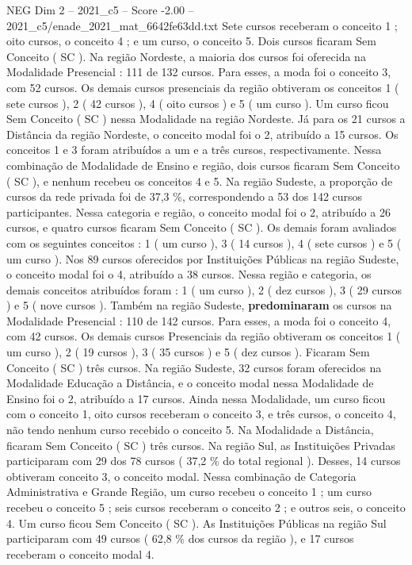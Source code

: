 \begin{textsample}{NEG Dim 2 – 2021\_c5 – Score -2.00 – 2021\_c5/enade\_2021\_mat\_6642fe63dd.txt}
Sete cursos receberam o conceito 1 ; oito cursos, o conceito 4 ; e um curso, o conceito 5.
Dois cursos ficaram Sem Conceito ( SC ).
Na região Nordeste, a maioria dos cursos foi oferecida na Modalidade Presencial : 111 de 132 cursos.
Para esses, a moda foi o conceito 3, com 52 cursos.
Os demais cursos presenciais da região obtiveram os conceitos 1 ( sete cursos ), 2 ( 42 cursos ), 4 ( oito cursos ) e 5 ( um curso ).
Um curso ficou Sem Conceito ( SC ) nessa Modalidade na região Nordeste.
Já para os 21 cursos a Distância da região Nordeste, o conceito modal foi o 2, atribuído a 15 cursos.
Os conceitos 1 e 3 foram atribuídos a um e a três cursos, respectivamente.
Nessa combinação de Modalidade de Ensino e região, dois cursos ficaram Sem Conceito ( SC ), e nenhum recebeu os conceitos 4 e 5.
Na região Sudeste, a proporção de cursos da rede privada foi de 37,3 \%, correspondendo a 53 dos 142 cursos participantes.
Nessa categoria e região, o conceito modal foi o 2, atribuído a 26 cursos, e quatro cursos ficaram Sem Conceito ( SC ).
Os demais foram avaliados com os seguintes conceitos : 1 ( um curso ), 3 ( 14 cursos ), 4 ( sete cursos ) e 5 ( um curso ).
Nos 89 cursos oferecidos por Instituições Públicas na região Sudeste, o conceito modal foi o 4, atribuído a 38 cursos.
Nessa região e categoria, os demais conceitos atribuídos foram : 1 ( um curso ), 2 ( dez cursos ), 3 ( 29 cursos ) e 5 ( nove cursos ).
Também na região Sudeste, \textbf{predominaram} os cursos na Modalidade Presencial : 110 de 142 cursos.
Para esses, a moda foi o conceito 4, com 42 cursos.
Os demais cursos Presenciais da região obtiveram os conceitos 1 ( um curso ), 2 ( 19 cursos ), 3 ( 35 cursos ) e 5 ( dez cursos ).
Ficaram Sem Conceito ( SC ) três cursos.
Na região Sudeste, 32 cursos foram oferecidos na Modalidade Educação a Distância, e o conceito modal nessa Modalidade de Ensino foi o 2, atribuído a 17 cursos.
Ainda nessa Modalidade, um curso ficou com o conceito 1, oito cursos receberam o conceito 3, e três cursos, o conceito 4, não tendo nenhum curso recebido o conceito 5.
Na Modalidade a Distância, ficaram Sem Conceito ( SC ) três cursos.
Na região Sul, as Instituições Privadas participaram com 29 dos 78 cursos ( 37,2 \% do total regional ).
Desses, 14 cursos obtiveram conceito 3, o conceito modal.
Nessa combinação de Categoria Administrativa e Grande Região, um curso recebeu o conceito 1 ; um curso recebeu o conceito 5 ; seis cursos receberam o conceito 2 ; e outros seis, o conceito 4.
Um curso ficou Sem Conceito ( SC ).
As Instituições Públicas na região Sul participaram com 49 cursos ( 62,8 \% dos cursos da região ), e 17 cursos receberam o conceito modal 4.

\end{textsample}
